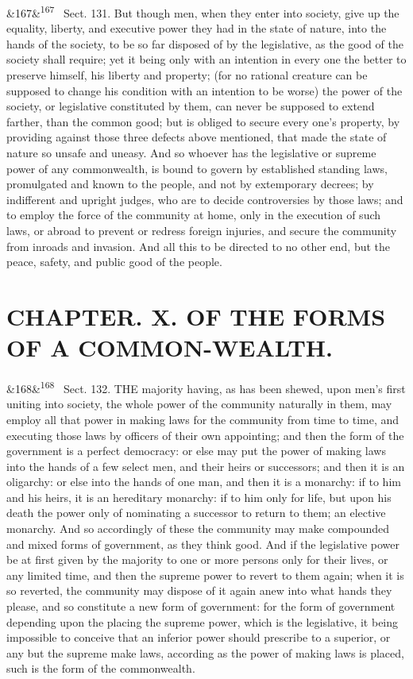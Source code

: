 \documentclass[12pt]{article}
\newcommand{\para}[1][]{\par\noindent\ifx&#1&\else\textsuperscript{\footnotesize #1}~\fi}
\begin{document}
\para[167] Sect. 131. But though men, when they enter into society, give up the equality, liberty, and executive power they had in the state of nature, into the hands of the society, to be so far disposed of by the legislative, as the good of the society shall require; yet it being only with an intention in every one the better to preserve himself, his liberty and property; (for no rational creature can be supposed to change his condition with an intention to be worse) the power of the society, or legislative constituted by them, can never be supposed to extend farther, than the common good; but is obliged to secure every one's property, by providing against those three defects above mentioned, that made the state of nature so unsafe and uneasy. And so whoever has the legislative or supreme power of any commonwealth, is bound to govern by established standing laws, promulgated and known to the people, and not by extemporary decrees; by indifferent and upright judges, who are to decide controversies by those laws; and to employ the force of the community at home, only in the execution of such laws, or abroad to prevent or redress foreign injuries, and secure the community from inroads and invasion. And all this to be directed to no other end, but the peace, safety, and public good of the people.

\section*{CHAPTER. X. OF THE FORMS OF A COMMON-WEALTH.}

\para[168] Sect. 132. THE majority having, as has been shewed, upon men's first uniting into society, the whole power of the community naturally in them, may employ all that power in making laws for the community from time to time, and executing those laws by officers of their own appointing; and then the form of the government is a perfect democracy: or else may put the power of making laws into the hands of a few select men, and their heirs or successors; and then it is an oligarchy: or else into the hands of one man, and then it is a monarchy: if to him and his heirs, it is an hereditary monarchy: if to him only for life, but upon his death the power only of nominating a successor to return to them; an elective monarchy. And so accordingly of these the community may make compounded and mixed forms of government, as they think good. And if the legislative power be at first given by the majority to one or more persons only for their lives, or any limited time, and then the supreme power to revert to them again; when it is so reverted, the community may dispose of it again anew into what hands they please, and so constitute a new form of government: for the form of government depending upon the placing the supreme power, which is the legislative, it being impossible to conceive that an inferior power should prescribe to a superior, or any but the supreme make laws, according as the power of making laws is placed, such is the form of the commonwealth.
\end{document}
